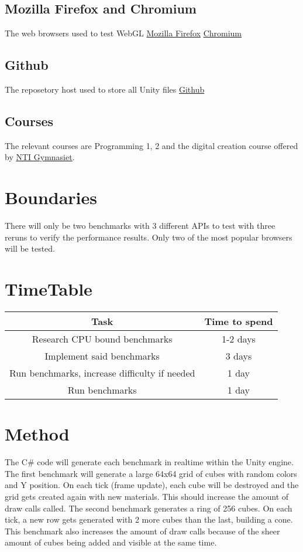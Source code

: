 \documentclass{article}
\begin{document}
\subsection* {Mozilla Firefox and Chromium}
The web browsers used to test WebGL
\newline\href{https://www.mozilla.org/en-US/firefox/new/}{Mozilla Firefox}
\newline\href{https://code.visualstudio.com/}{Chromium}


\subsection* {Github}
The reposetory host used to store all Unity files
\newline\href{https://github.com}{Github}

\subsection* {Courses}
The relevant courses are Programming 1, 2 and the digital creation course offered by \href{https://www.ntigymnasiet.se/}{NTI Gymnasiet}.


\section {Boundaries}
There will only be two benchmarks with 3 different APIs to test with three reruns to verify the performance results. Only two of the most popular browsers will be tested.

\section {TimeTable}
\begin{center}
\begin{tabular}{ |c|c| }
\hline
\textbf {Task} & \textbf {Time to spend} \\
\hline
Research CPU bound benchmarks & 1-2 days \\
\hline
Implement said benchmarks & 3 days \\
\hline
Run benchmarks, increase difficulty if needed & 1 day \\
\hline
Run benchmarks & 1 day \\
\hline
\end{tabular}
\end{center}


\section {Method}
The C\# code will generate each benchmark in realtime within the Unity engine. The first benchmark will generate a large 64x64 grid of cubes with random colors and Y position. On each tick (frame update), each cube will be destroyed and the grid gets created again with new materials. This should increase the amount of draw calls called. The second benchmark generates a ring of 256 cubes. On each tick, a new row gets generated with 2 more cubes than the last, building a cone. This benchmark also increases the amount of draw calls because of the sheer amount of cubes being added and visible at the same time.\par
\end{document}
